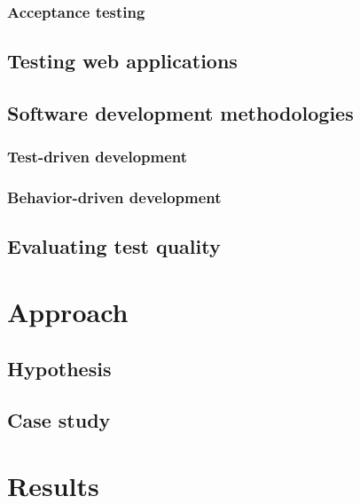 \documentclass[a4paper]{report}
\begin{document}
    \subsection{Acceptance testing}
    


  \section{Testing web applications}
    


  \section{Software development methodologies}
    

    \subsection{Test-driven development}
    \label{sec:tdd}
    

    \subsection{Behavior-driven development}
    \label{sec:bdd}
    


  \section{Evaluating test quality}
    \label{sec:quality}
    


\chapter{Approach}

  

  \section{Hypothesis}
  \label{sec:hypothesis}
  

  \section{Case study}
  


\chapter{Results}
\label{chap:results}
\end{document}
